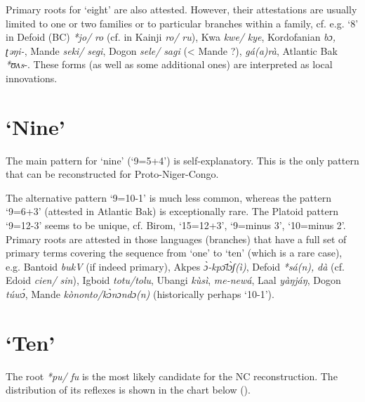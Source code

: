Primary roots for ‘eight’ are also attested. However, their attestations are usually limited to one or two families or to particular branches within a family, cf. e.g. ‘8’ in Defoid (BC) \textit{*jo/} \textit{ro} (cf. in Kainji \textit{ro/} \textit{ru}), Kwa \textit{kwe/} \textit{kye}, Kordofanian \textit{bɔ,} \textit{ʈəŋi-}, Mande \textit{seki/} \textit{segi}, Dogon \textit{sele/} \textit{sagi} (< Mande ?), \textit{gá(a)rà}, Atlantic Bak \textit{*ʊʌs}-. These forms (as well as some additional ones) are interpreted as local innovations. 

\clearpage
\section{‘Nine’}%
 
The main pattern for ‘nine’ (‘9=5+4’) is self-explanatory. This is the only pattern that can be reconstructed for Proto-Niger-Congo.

The alternative pattern ‘9=10-1’ is much less common, whereas the pattern ‘9=6+3’ (attested in Atlantic Bak) is exceptionally rare. The Platoid pattern ‘9=12-3’ seems to be unique, cf. Birom, ‘15=12+3’, ‘9=minus 3’, ‘10=minus 2’. Primary roots are attested in those languages (branches) that have a full set of primary terms covering the sequence from ‘one’ to ‘ten’ (which is a rare case), e.g. Bantoid \textit{bukV} (if indeed primary), Akpes \textit{{\`{ɔ}}-kp{\={ɔ}}l{\`{ɔ}}ʃ(ì)}, Defoid \textit{*sá(n),} \textit{dà} (cf. Edoid \textit{cien/} \textit{sin}), Igboid \textit{totu/tolu}, Ubangi \textit{k{\`{u}}sì}, \textit{me-newá}, Laal \textit{yàŋjáŋ}, Dogon \textit{t{\'{u}}w{\'{ɔ}}}, Mande \textit{kònonto/k{\`{ɔ}}nɔndɔ(n)} (historically perhaps ‘10-1’).

\clearpage
\section{‘Ten’}%
The root \textit{*pu/} \textit{fu} is the most likely candidate for the NC reconstruction. The distribution of its reflexes is shown in the chart below ().

